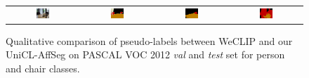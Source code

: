 \begin{figure}[ht]
\begin{tcolorbox}[colframe=black!60, colback=white, boxrule=0.8pt, arc=2pt, left=2pt, right=2pt, top=2pt, bottom=2pt]
\begin{tabular}{cccc}
      
      \includegraphics[width=0.20\textwidth,height=0.20\textwidth]
      {figures/person_and_chair/originals/2008_003477}
                &
      \includegraphics[width=0.20\textwidth,height=0.20\textwidth]
      {figures/person_and_chair/gt/2008_003477}
                &
      \includegraphics[width=0.20\textwidth,height=0.20\textwidth]
      {figures/person_and_chair/weclip/2008_003477_[8, 10]}
                &
      \includegraphics[width=0.20\textwidth,height=0.20\textwidth]
      {figures/person_and_chair/ours/2008_003477_[8, 10]}    \\


    \end{tabular}

    \caption{Qualitative comparison of pseudo-labels between WeCLIP and our UniCL-AffSeg on PASCAL VOC 2012 \textit{val} and \textit{test} set for person and chair classes.}
    \label{fig:qualitative_comparison_pseudolabel_person_chair}
  \end{tcolorbox}
\end{figure}

